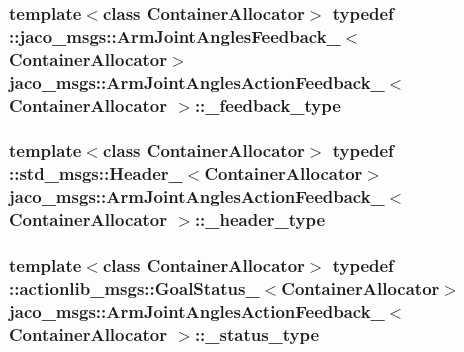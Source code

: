 \subsubsection[{\texorpdfstring{\+\_\+feedback\+\_\+type}{_feedback_type}}]{\setlength{\rightskip}{0pt plus 5cm}template$<$class Container\+Allocator$>$ typedef \+::{\bf jaco\+\_\+msgs\+::\+Arm\+Joint\+Angles\+Feedback\+\_\+}$<$Container\+Allocator$>$ {\bf jaco\+\_\+msgs\+::\+Arm\+Joint\+Angles\+Action\+Feedback\+\_\+}$<$ Container\+Allocator $>$\+::{\bf \+\_\+feedback\+\_\+type}}\hypertarget{structjaco__msgs_1_1ArmJointAnglesActionFeedback___a7256b5b631f5765fd7a67cbd8dfe5b47}{}\label{structjaco__msgs_1_1ArmJointAnglesActionFeedback___a7256b5b631f5765fd7a67cbd8dfe5b47}
\subsubsection[{\texorpdfstring{\+\_\+header\+\_\+type}{_header_type}}]{\setlength{\rightskip}{0pt plus 5cm}template$<$class Container\+Allocator$>$ typedef \+::std\+\_\+msgs\+::\+Header\+\_\+$<$Container\+Allocator$>$ {\bf jaco\+\_\+msgs\+::\+Arm\+Joint\+Angles\+Action\+Feedback\+\_\+}$<$ Container\+Allocator $>$\+::{\bf \+\_\+header\+\_\+type}}\hypertarget{structjaco__msgs_1_1ArmJointAnglesActionFeedback___a6607c88f7d652054e5c5295d2b0f2c1d}{}\label{structjaco__msgs_1_1ArmJointAnglesActionFeedback___a6607c88f7d652054e5c5295d2b0f2c1d}
\subsubsection[{\texorpdfstring{\+\_\+status\+\_\+type}{_status_type}}]{\setlength{\rightskip}{0pt plus 5cm}template$<$class Container\+Allocator$>$ typedef \+::actionlib\+\_\+msgs\+::\+Goal\+Status\+\_\+$<$Container\+Allocator$>$ {\bf jaco\+\_\+msgs\+::\+Arm\+Joint\+Angles\+Action\+Feedback\+\_\+}$<$ Container\+Allocator $>$\+::{\bf \+\_\+status\+\_\+type}}\hypertarget{structjaco__msgs_1_1ArmJointAnglesActionFeedback___aab3ce75e46a0b19c8699b2d683d7bf1d}{}\label{structjaco__msgs_1_1ArmJointAnglesActionFeedback___aab3ce75e46a0b19c8699b2d683d7bf1d}
